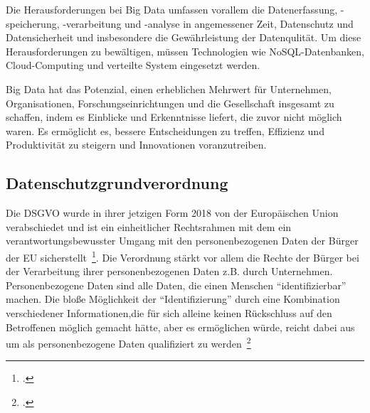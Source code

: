 Die Herausforderungen bei Big Data umfassen vorallem die Datenerfassung, -speicherung, -verarbeitung und -analyse in angemessener Zeit, Datenschutz und Datensicherheit und insbesondere die Gewährleistung der 
Datenqulität. Um diese Herausforderungen zu bewältigen, müssen Technologien wie NoSQL-Datenbanken, Cloud-Computing und verteilte System eingesetzt werden.

Big Data hat das Potenzial, einen erheblichen Mehrwert für Unternehmen, Organisationen, Forschungseinrichtungen und die Gesellschaft insgesamt zu schaffen, indem es Einblicke und Erkenntnisse liefert, 
die zuvor nicht möglich waren. Es ermöglicht es, bessere Entscheidungen zu treffen, Effizienz und Produktivität zu steigern und Innovationen voranzutreiben.

\subsection{Datenschutzgrundverordnung}

Die \ac{DSGVO} wurde in ihrer jetzigen Form 2018 von der Europäischen Union verabschiedet und ist ein einheitlicher Rechtsrahmen mit dem ein verantwortungsbewusster Umgang
mit den personenbezogenen Daten der Bürger der \ac{EU} sicherstellt~\footcite[\vglf][]{Voigt.2018}.
Die Verordnung stärkt vor allem die Rechte der Bürger bei der Verarbeitung ihrer personenbezogenen Daten z.B. durch Unternehmen. Personenbezogene Daten sind alle Daten, die einen Menschen
\enquote{identifizierbar} machen. Die bloße Möglichkeit der \enquote{Identifizierung} durch eine Kombination verschiedener Informationen,die für sich alleine keinen Rückschluss 
auf den Betroffenen möglich gemacht hätte, aber es ermöglichen würde, reicht dabei aus um als personenbezogene Daten qualifiziert zu werden~\footcite[\vglf][]{Voigt.2018}

